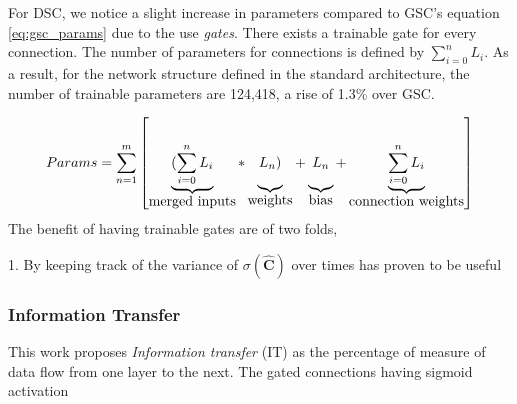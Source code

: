 \documentclass{article}
\let\oldhat\hat
\renewcommand{\hat}[1]{\oldhat{\mathbf{#1}}}
\begin{document}
For DSC, we notice a slight increase in parameters compared to GSC's equation \ref{eq:gsc_params} due to the use \emph{gates}. There exists a trainable gate for every connection. The number of parameters for connections is defined by $\sum_{i=0}^{n}L_{i}$. As a result, for the network structure defined in the standard architecture, the number of trainable parameters are 124,418, a rise of 1.3\% over GSC.

\begin{equation}
\label{eq:dsc_params}
Params= \sum_{n=1}^{m}\left[
\underbrace{(\sum_{i=0}^{n}L_{i}\rule[-12pt]{0pt}{5pt}}_{\mbox{merged inputs}}
*\underbrace{L_{n})\rule[-12pt]{0pt}{5pt}}_{\mbox{weights}}
+\underbrace{L_{n}\rule[-12pt]{0pt}{5pt}}_{\mbox{bias}}
+\underbrace{\sum_{i=0}^{n}L_{i}\rule[-12pt]{0pt}{5pt}}_{\mbox{connection weights}}\right]
\end{equation}
The benefit of having trainable gates are of two folds,

1. By keeping track of the variance of $\sigma{(\hat{C})}$ over times has proven to be useful  




\subsubsection{Information Transfer}
This work proposes \emph{Information transfer} (IT) as the percentage of measure of data flow from one layer to the next. The gated connections having sigmoid activation 
\end{document}
